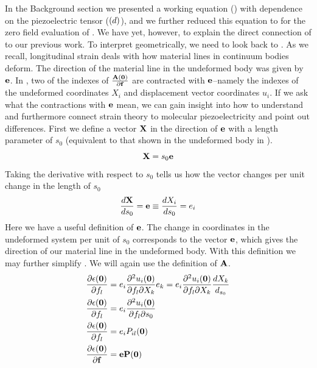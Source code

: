 In the Background section we presented a working equation () with dependence on the piezoelectric tensor (${\mathbf (}d)$),
and we further reduced this equation to  for the 
zero field evaluation of \dtt.  
We have yet, however, to explain the direct connection of  to our previous work.  
To interpret  geometrically, we need to look back to .  
As we recall, longitudinal strain deals with how material lines in continuum bodies deform.  
The direction of the material line in the undeformed
body was given by ${\mathbf e}$. 
In , two of the indexes of $\frac{{\mathbf A}({\mathbf 0})}{\partial {\mathbf f}}$ are contracted with ${\mathbf e}$--namely the indexes of the 
undeformed coordinates $X_i$ and displacement vector coordinates $u_i$.  
If we ask what the contractions with ${\mathbf e}$ mean, we can gain insight into how to understand \dtt and furthermore connect strain theory to 
molecular piezoelectricity and point out differences.  
First we define a vector ${\mathbf X}$ in the direction of ${\mathbf e}$ with a length parameter of $s_0$ (equivalent to that shown in 
the undeformed body in ).  
\begin{equation}
 {\mathbf X} = s_0 {\mathbf e}
\end{equation}
Taking the derivative with respect to $s_0$ tells us how the vector changes per unit change in the length of $s_0$
\begin{equation}
\label{eq:dxds_0}
 \frac{d{\mathbf X}}{ds_0}= {\mathbf e}  \equiv \frac{dX_i}{ds_0} = e_i
\end{equation}
Here we have a useful definition of ${\mathbf e}$.  
The change in coordinates in the undeformed system per unit of $s_0$ corresponds to the 
vector ${\mathbf e}$, which gives the direction of our material line in the undeformed body.  
With this definition we may further simplify .  We will
again use the definition of ${\mathbf A}$.  
\begin{equation}
\begin{split}
\label{eq:Meq}
\frac{\partial \epsilon ({\bf{0}})}{\partial f_l}&= e_i\frac{\partial^2 u_i({\mathbf 0})}{\partial f_l \partial X_k}e_k = e_i \frac{\partial^2 u_i({\mathbf 0})}{\partial f_l \partial X_k}\frac{dX_k}{d_{s_0}}\\
\frac{\partial \epsilon ({\bf{0}})}{\partial f_l}&=e_i\frac{\partial^2 u_i({\mathbf 0})}{\partial f_l \partial s_0}\\
\frac{\partial \epsilon ({\bf{0}})}{\partial f_l}&=e_i P_{il}({\mathbf 0})\\
\frac{\partial \epsilon ({\bf{0}})}{\partial {\mathbf f}}&={\mathbf e}{\mathbf P}({\mathbf 0})
\end{split}
\end{equation}
